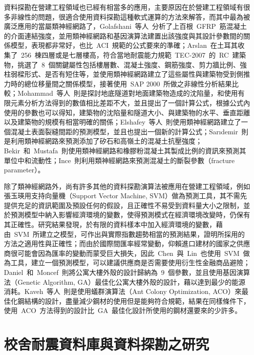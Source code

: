 資料探勘在營建工程領域也已經有相當多的應用，主要原因在於營建工程領域有很多非線性的問題，很適合使用資料探勘這種軟式運算的方法來解答，而其中最為被廣泛應用的當屬類神經網路了，Golafshani~等人\cite{golafshani2014artificial}~分析了上百根~GFRP~筋混凝土的介面連結強度，並用類神經網路和基因演算法建置出該強度與其設計參數間的關係模型，表現都非常好，也比~ACI\cite{aci2006guide}~規範的公式要來的準確；Arslan\cite{arslan2010evaluation}~在土耳其收集了~256~棟四層或是七層樓高，符合當地耐震能力規範~TEC-2007~的~RC~建築物，挑選了~8~個關鍵屬性包括樓層數、混凝土強度、鋼筋強度、剪力牆比例、強柱弱樑形式、是否有短住等，並使用類神經網路建立了這些屬性與建築物受到側推力時的總位移量間之關係模型，接著使用~SAP 2000~所做之非線性分析結果比較；Mohammad~等人\cite{azadi2013assessment}~則是探討地底隧道對地面建築物造成的沈陷量，和使用有限元素分析方法得到的數值相比差距不大，並且提出了一個計算公式，根據公式內使用的參數也可以得知，建築物的沈陷量和隧道大小、與建築物的水平、垂直距離以及建築物的規模有相當明確的關係；Elshafey~等人\cite{elshafey2013predicting}~則使用類神經網路建立了一個混凝土表面裂縫間距的預測模型，並且也提出一個新的計算公式；Sarıdemir\cite{saridemir2009prediction}~則是利用類神經網路來預測添加了矽石和高嶺土的混凝土抗壓強度；Bekir~和~Mustafa\cite{topccu2008prediction}~則使用類神經網路和橡膠粉混凝土其製成比例的資訊來預測其單位中和流動性；Ince\cite{ince2004prediction}~則利用類神經網路來預測混凝土的斷裂參數（fracture parameter）。

除了類神經網路外，尚有許多其他的資料探勘演算法被應用在營建工程領域，例如張玉瑛\cite{chang2007master}用支持向量機（Support Vector Machine, SVM）做為預測工具，其不需先提供充足的資訊範圍及預設任何的假設，且正確性不易受到資料量大小之限制，並於預測模型中納入影響經濟環境的變數，使得預測模式在經濟環境改變時，仍保有其正確性。研究結果發現，於有限的資料樣本中加入經濟環境的變數，藉由~SVM~所建立之模型，可作出與實際指數趨勢相當的預測結果，證明所採用的方法之適用性與正確性；而由於國際間匯率經常變動，仰賴進口建材的國家之供應商很可能會因為匯率的變動而蒙受巨大損失，因此~Chen~與~Lin\cite{chen2010developing}~也使用~SVM~做為工具，建立一個預測模型，可以建議供應商是否需要使用衍生性金融商品避險；Daniel~和~Moncef\cite{tuhus2010genetic}~則將公寓大樓外殼的設計歸納為~9~個參數，並且使用基因演算法（Genetic Algorithm, GA）最佳化公寓大樓外殼的設計，藉以達到最少的能源消耗。Kaveh~等人\cite{kaveh2010performance}~則是使用蟻群演算法（Ant Colony Optimization, ACO）來最佳化鋼結構的設計，盡量減少鋼材的使用但是能夠符合規範，結果在同樣條件下，使用~ACO~方法得到的設計比~GA~最佳化設計所使用的鋼材還要來的少許多。

\section{校舍耐震資料庫與資料探勘之研究}

